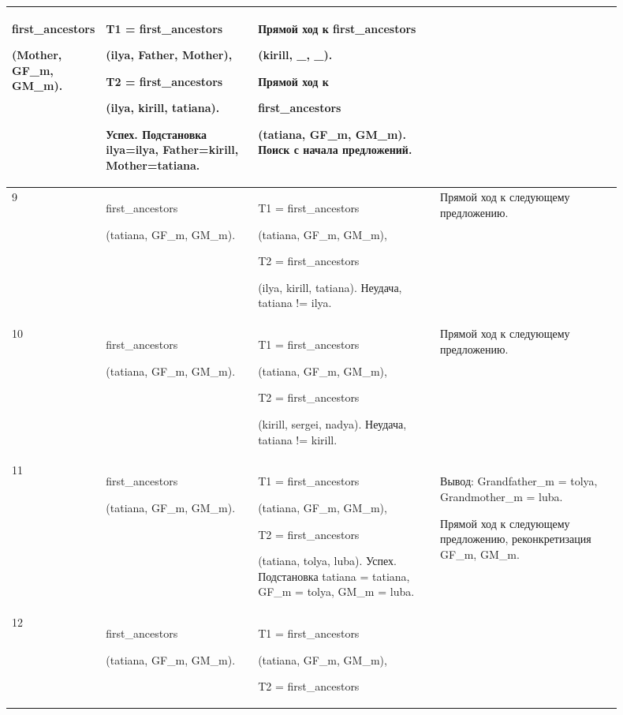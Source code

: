\documentclass[a4paper,12pt]{article}
\begin{document}
\begin{center}
\begin{longtable}[h!]{|p{0.05\linewidth}|p{0.25\linewidth}|p{ 0.3\linewidth}|p{ 0.3\linewidth}|}
{first\_ancestors

(Mother, GF\_m, GM\_m).} & {T1 = first\_ancestors

(ilya, Father, Mother),

T2 = first\_ancestors

(ilya, kirill, tatiana).

Успех. Подстановка ilya=ilya, Father=kirill, Mother=tatiana.} & {Прямой ход к first\_ancestors

(kirill, \_, \_). 

Прямой ход к

first\_ancestors

(tatiana, GF\_m, GM\_m). Поиск с начала предложений.}\\
			\hline
			{9} & {first\_ancestors
			
		(tatiana, GF\_m, GM\_m).} & {T1 = first\_ancestors
		
		(tatiana, GF\_m, GM\_m),
	
T2 = first\_ancestors

(ilya, kirill, tatiana). Неудача, tatiana != ilya.} & {Прямой ход к следующему предложению.}\\
			\hline
			{10} & {first\_ancestors
				
				(tatiana, GF\_m, GM\_m).} & {T1 = first\_ancestors
				
				(tatiana, GF\_m, GM\_m),
				
				T2 = first\_ancestors
				
				(kirill, sergei, nadya). Неудача, tatiana != kirill.} & {Прямой ход к следующему предложению.}\\
			\hline
			{11} & {first\_ancestors
				
				(tatiana, GF\_m, GM\_m).} & {T1 = first\_ancestors
				
				(tatiana, GF\_m, GM\_m),
				
				T2 = first\_ancestors
				
				(tatiana, tolya, luba). Успех. Подстановка tatiana = tatiana, 
				GF\_m = tolya, GM\_m = luba.} & {Вывод: Grandfather\_m = tolya, Grandmother\_m = luba.
			
		Прямой ход к следующему предложению, реконкретизация GF\_m, GM\_m.}\\
			\hline
			{12} & {first\_ancestors
				
				(tatiana, GF\_m, GM\_m).} & {T1 = first\_ancestors
				
				(tatiana, GF\_m, GM\_m),
				
				T2 = first\_ancestors
				
}
\end{longtable}
\end{center}
\end{document}
